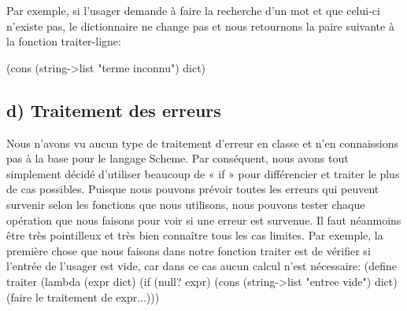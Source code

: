 \documentclass[french]{article}
\begin{document}
			Par exemple, si l'usager demande à faire la recherche d'un mot et que celui-ci n'existe pas, le dictionnaire ne change pas et nous retournons la paire suivante à la fonction traiter-ligne:
			
			(cons (string->list "terme inconnu") dict)
		
		\subsection{d) Traitement des erreurs}
			Nous n'avons vu aucun type de traitement d'erreur en classe et n'en connaissions pas à la base pour le langage Scheme. Par conséquent, nous avons tout simplement décidé d’utiliser beaucoup de « if »  pour différencier et traiter le plus de cas possibles. Puisque nous pouvons prévoir toutes les erreurs qui peuvent survenir selon les fonctions que nous utilisons, nous pouvons tester chaque opération que nous faisons pour voir si une erreur est survenue. Il faut néanmoins être très pointilleux et très bien connaître tous les cas limites. Par exemple, la première chose que nous faisons dans notre fonction traiter est de vérifier si l'entrée de l'usager est vide, car dans ce cas aucun calcul n'est nécessaire:
			(define traiter
				(lambda (expr dict)
					(if (null? expr) (cons (string->list "entree vide") dict)
										  (faire le traitement de expr...)))
		
\end{document}
